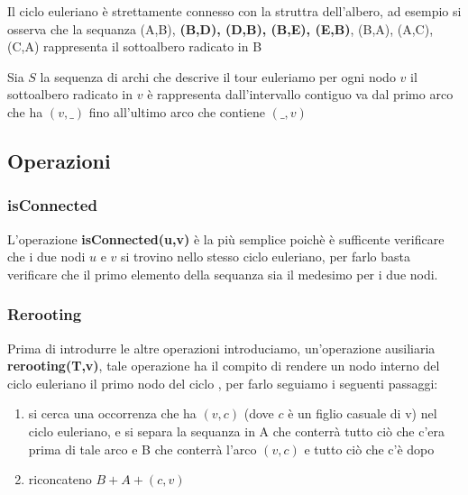 \begin{algorithm}[H]
    \caption{Creazione Tour Euleriano }
    \label{alg:make_ETT}
    \SetAlgoLined
    \DontPrintSemicolon
    
    
    \BlankLine 


\end{algorithm}

Il ciclo euleriano è strettamente connesso con la struttra dell'albero, ad esempio si osserva che la sequanza (A,B), \textbf{(B,D), (D,B), (B,E), (E,B)}, (B,A), (A,C), (C,A) rappresenta il sottoalbero radicato in B

\begin{kaobox}[frametitle = Claim]
    Sia $S$ la sequenza di archi che descrive 
    il tour euleriamo per ogni nodo $v$ il 
    sottoalbero radicato in $v$ è rappresenta dall'intervallo 
    contiguo va dal primo arco che ha $(v,\_)$ fino all'ultimo arco che contiene $(\_,v)$    
\end{kaobox}\setchapterpreamble[u]{\margintoc}

\subsection{Operazioni}

\subsubsection{isConnected}
L'operazione \textbf{isConnected(u,v)} è la più semplice poichè è sufficente verificare che i due nodi $u$ e $v$ si trovino nello stesso ciclo euleriano, per farlo basta verificare che il primo elemento della sequanza sia il medesimo per i due nodi.

\subsubsection{Rerooting}
Prima di introdurre le altre operazioni introduciamo,
un'operazione ausiliaria \textbf{rerooting(T,v)}, 
tale operazione ha il compito di rendere un nodo 
interno del ciclo euleriano il primo nodo del ciclo
, per farlo seguiamo i seguenti passaggi:

\begin{enumerate}
    \item si cerca una occorrenza che ha $(v,c)$ (dove $c$ è un figlio casuale di v) nel ciclo euleriano, e si separa la sequanza in A che conterrà tutto ciò che c'era prima di tale arco e B che conterrà l'arco $(v,c)$ e tutto ciò che c'è dopo
    \item riconcateno $B + A + (c,v)$
\end{enumerate}


